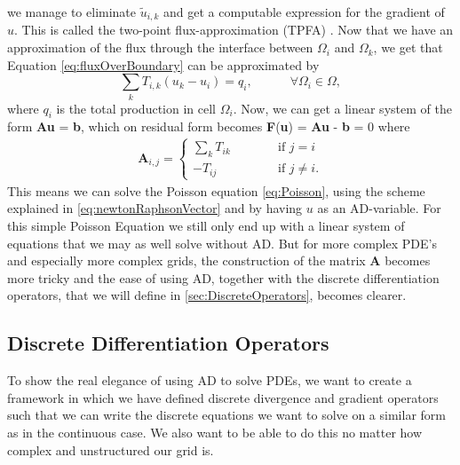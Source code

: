 we manage to eliminate $\tilde{u}_{i,k}$ and get a computable expression for the gradient of $u$. This is called the two-point flux-approximation (TPFA) \emph{\citep{lieMrstUrl}}. Now that we have an approximation of the flux through the interface between $\Omega_i$ and $\Omega_k$, we get that Equation \eqref{eq:fluxOverBoundary} can be approximated by 
\begin{equation}
    \sum_k T_{i,k}(u_k - u_i) = q_i, \hspace{3em} \forall \Omega_i \in \Omega,
    \label{eq:PoissonSolvableTwoCells}
\end{equation}
where $q_i$ is the total production in cell $\Omega_i$. Now, we can get a linear system of the form \textbf{A}\textbf{u} = \textbf{b},  which on residual form becomes \textbf{F}(\textbf{u}) = \textbf{A}\textbf{u} - \textbf{b} = 0 where
\begin{align*}
    \textbf{A}_{i,j} = 
    \left\lbrace
    \begin{array}{lr}
    \sum_k T_{ik} \hspace{3em}&\text{if } j = i\\
    -T_{ij} \hspace{3em}&\text{if } j \neq i.
    \end{array}
    \right.
\end{align*}
This means we can solve the Poisson equation \eqref{eq:Poisson}, using the scheme explained in \eqref{eq:newtonRaphsonVector} and by having $u$ as an AD-variable. For this simple Poisson Equation we still only end up with a linear system of equations that we may as well solve without AD. But for more complex PDE's and especially more complex grids, the construction of the matrix \textbf{A} becomes more tricky and the ease of using AD, together with the discrete differentiation operators, that we will define in \autoref{sec:DiscreteOperators}, becomes clearer.

\subsection{Discrete Differentiation Operators}
\label{sec:DiscreteOperators}
To show the real elegance of using AD to solve PDEs, we want to create a framework in which we have defined discrete divergence and gradient operators such that we can write the discrete equations we want to solve on a similar form as in the continuous case. We also want to be able to do this no matter how complex and unstructured our grid is.

